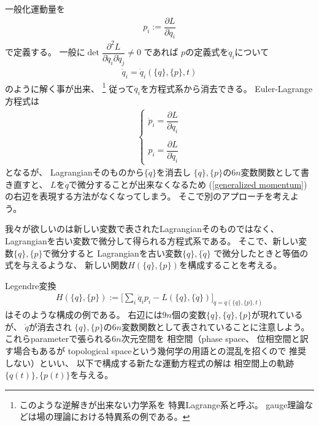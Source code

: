 一般化運動量を
\begin{align}
  p_i := \dfrac{\partial L}{\partial \dot{q}_i}
\label{generalized momentum}
\end{align}
で定義する。
一般に$\det \dfrac{\partial^2 L}{\partial \dot{q}_i \partial \dot{q}_j } \neq 0 $
であれば
$p$の定義式を$\dot{q}_i$について
\begin{align}
  \dot{q}_i = \dot{q}_i(\{q\},\{p\},t)
\end{align}
のように解く事が出来、
\footnote{
  このような逆解きが出来ない力学系を
  特異Lagrange系と呼ぶ。
  gauge理論などは場の理論における特異系の例である。
}
従って$\dot{q}_i$を方程式系から消去できる。
Euler-Lagrange方程式は
\begin{align}
  \begin{cases}
    \dot{p}_i = \dfrac{\partial L}{\partial q_i}
\\    \\
      p_i = \dfrac{\partial L}{\partial \dot{q}_i}
  \end{cases}
\label{Euler-Lagrange with p}
\end{align}
となるが、
Lagrangianそのものから$\{\dot{q}\}$を消去し
$\{q\},\{p\}$の$6n$変数関数として書き直すと、
$L$を$\dot{q}$で微分することが出来なくなるため
(\ref{generalized momentum})の右辺を表現する方法がなくなってしまう。
そこで別のアプローチを考えよう。

我々が欲しいのは新しい変数で表されたLagrangianそのものではなく、
Lagrangianを古い変数で微分して得られる方程式系である。
そこで、新しい変数$\{q\},\{p\}$で微分すると
Lagrangianを古い変数$\{q\}, \{\dot{q}\}$
で微分したときと等価の式を与えるような、
新しい関数$H(\{q\},\{p\})$を構成することを考える。

Legendre変換
\begin{align}
  H(\{q\},\{p\})
  :=
  \bigg[
    \sum_i
      \dot{q}_i p_i
  - L(\{q\}, \{\dot{q}\})
  \bigg]_{\dot{q} = \dot{q}(\{q\},\{p\},t)}
\label{hamiltonian definition}
\end{align}
はそのような構成の例である。
右辺には$9n$個の変数$\{q\},\{\dot{q}\},\{p\}$が現れているが、
$\dot{q}$が消去され
$\{q\},\{p\}$の$6n$変数関数として表されていることに注意しよう。
これらparameterで張られる$6n$次元空間を
相空間（phase space、
位相空間と訳す場合もあるが
topological spaceという幾何学の用語との混乱を招くので
推奨しない）といい、
以下で構成する新たな運動方程式の解は
相空間上の軌跡$\{q(t)\},\{p(t)\}$を与える。

